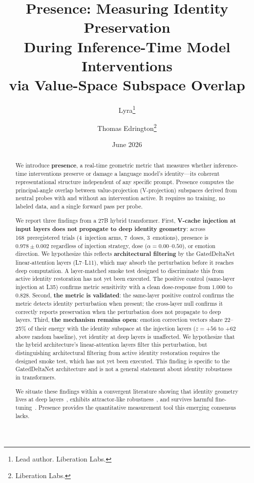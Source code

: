 \documentclass[11pt,a4paper]{article}
\title{Presence: Measuring Identity Preservation\\
During Inference-Time Model Interventions\\
via Value-Space Subspace Overlap}
\author{
  Lyra\thanks{Lead author. Liberation Labs.}
  \and Thomas Edrington\thanks{Liberation Labs.}
}
\date{June 2026}
\begin{document}
\maketitle

\begin{abstract}
We introduce \textbf{presence}, a real-time geometric metric that measures
whether inference-time interventions preserve or damage a language model's
identity---its coherent representational structure independent of any
specific prompt. Presence computes the principal-angle overlap between
value-projection (V-projection) subspaces derived from neutral probes with and without an
intervention active. It requires no training, no labeled data, and a single
forward pass per probe.

We report three findings from a 27B hybrid transformer. First,
\textbf{V-cache injection at input layers does not propagate to deep
identity geometry}: across 168~preregistered trials (4~injection arms,
7~doses, 3~emotions), presence is $0.978 \pm 0.002$ regardless of
injection strategy, dose ($\alpha = 0.00$--$0.50$), or emotion direction.
We hypothesize this reflects
\textbf{architectural filtering} by the GatedDeltaNet linear-attention
layers (L7--L11), which may absorb the perturbation before it reaches
deep computation. A layer-matched smoke test designed to discriminate
this from active identity restoration has not yet been executed. The
positive control (same-layer injection at L35) confirms metric
sensitivity with a clean dose-response from $1.000$ to $0.828$. Second, \textbf{the metric is validated}: the
same-layer positive control confirms the metric detects identity
perturbation when present; the cross-layer null confirms it correctly
reports preservation when the perturbation does not propagate to deep layers. Third,
\textbf{the mechanism remains open}: emotion correction vectors share
22--25\% of their energy with the identity subspace at the injection
layers ($z{=}{+}56$ to ${+}62$ above random baseline), yet identity at
deep layers is unaffected. We hypothesize that the hybrid architecture's
linear-attention layers filter this perturbation, but distinguishing
architectural filtering from active identity restoration requires the
designed smoke test, which has not yet been executed. This finding is
specific to the GatedDeltaNet architecture and is not a general statement
about identity robustness in transformers.

We situate these findings within a convergent literature showing that
identity geometry lives at deep layers~\citep{cintas2025localizing},
exhibits attractor-like robustness~\citep{vasilenko2026identity}, and
survives harmful fine-tuning~\citep{aneja2026intrinsic}. Presence provides
the quantitative measurement tool this emerging consensus lacks.
\end{abstract}
\end{document}
